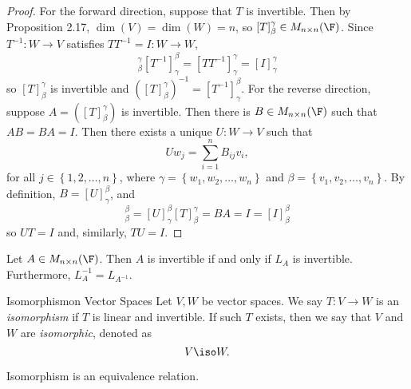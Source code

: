 \documentclass[linearalgebra]{subfiles}
\begin{document}
    \begin{proof}
        For the forward direction, suppose that $T$ is invertible. Then by Proposition 2.17, $\dim(V) = \dim(W) = n$, so $[T]^\gamma_\beta \in M_{n\times n}(\F)$. Since $T^{-1}: W\to V$ satisfies $TT^{-1} = I: W\to W$,
        \begin{equation*}
            [T]^\gamma_\beta [T^{-1}]^\beta_\gamma = [TT^{-1}]^\gamma_\gamma = [I]^\gamma_\gamma
        \end{equation*}
        so $[T]^\gamma_\beta$ is invertible and $\left( [T]^\gamma_\beta \right)^{-1} = \left[ T^{-1} \right] ^\beta_\gamma$. For the reverse direction, suppose $A = \left( [T]^\gamma_\beta \right)$ is invertible. Then there is $B\in M_{n\times n}(\F)$ such that $AB = BA = I$. Then there exists a unique $U:W\to V$ such that
        \begin{equation*}
            Uw_j = \sum^{n}_{i=1} B_{ij}v_i,
        \end{equation*}
        for all $j\in\left\lbrace 1,2,\ldots,n \right\rbrace$, where $\gamma = \left\lbrace w_1, w_2, \ldots, w_n \right\rbrace$ and $\beta = \left\lbrace v_1, v_2, \ldots, v_n \right\rbrace$. By definition, $B = [U]^\beta_\gamma$, and
        \begin{equation*}
            [UT]^\beta_\beta = [U]^\beta_\gamma [T]^\gamma_\beta = BA = I = [I]^\beta_\beta
        \end{equation*}
        so $UT = I$ and, similarly, $TU = I$.
    \end{proof}

    \begin{cor}{}
        Let $A\in M_{n\times n}(\F)$. Then $A$ is invertible if and only if $L_A$ is invertible. Furthermore, $L_A^{-1} = L_{A^{-1}}$.
    \end{cor}	

    \begin{definition}{Isomorphism}{on Vector Spaces}
        Let $V, W$ be vector spaces. We say $T:V\to W$ is an \emph{isomorphism} if $T$ is linear and invertible. If such $T$ exists, then we say that $V$ and $W$ are \emph{isomorphic}, denoted as
        \begin{equation*}
            V\iso W.
        \end{equation*}
    \end{definition}

    \begin{remark}
        Isomorphism is an equivalence relation.
    \end{remark}
\end{document}
